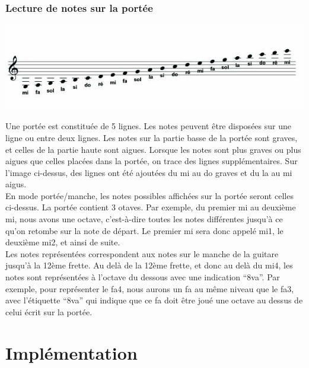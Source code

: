 \documentclass{scrreprt}
\begin{document}
\subsection{Lecture de notes sur la portée}


\bigbreak
\includegraphics[width=\textwidth]{str-images/note_portee.jpg}
\bigbreak

Une portée est constituée de 5 lignes. 
Les notes peuvent être disposées sur une ligne ou entre deux lignes. Les notes sur la partie basse de la portée sont graves, et celles de la partie haute sont aigues. 
Lorsque les notes sont plus graves ou plus aigues que celles placées dans la portée, on trace des lignes supplémentaires. Sur l'image ci-dessus, des lignes ont été ajoutées du mi au do graves et du la au mi aigus.\\
En mode portée/manche, les notes possibles affichées sur la portée seront celles ci-dessus.
La portée contient 3 otaves. 
Par exemple, du premier mi au deuxième mi, nous avons une octave, c'est-à-dire toutes les notes différentes jusqu'à ce qu'on retombe sur la note de départ.
Le premier mi sera donc appelé mi1, le deuxième mi2, et ainsi de suite.\\
Les notes représentées correspondent aux notes sur le manche de la guitare jusqu'à la 12ème frette. 
Au delà de la 12ème frette, et donc au delà du mi4, les notes sont représentées à l'octave du dessous avec une indication \enquote{8va}.
Par exemple, pour représenter le fa4, nous aurons un fa au même niveau que le fa3, avec l'étiquette \enquote{8va} qui indique que ce fa doit être joué une octave au dessus de celui écrit sur la portée.

\chapter{Implémentation}
\end{document}
